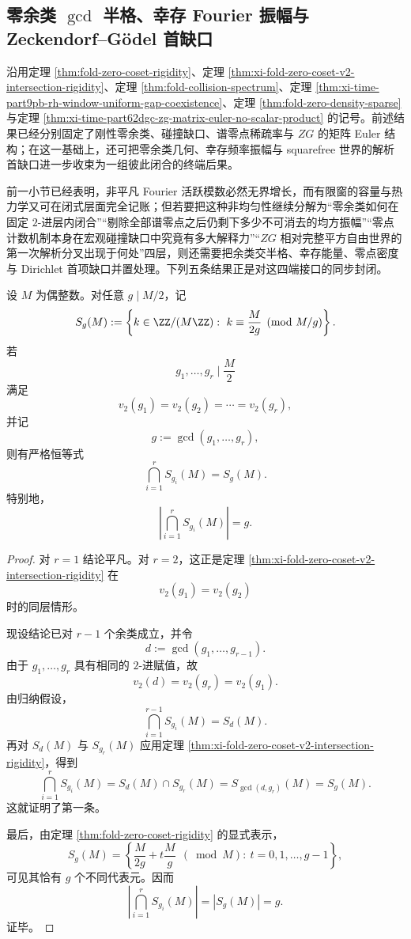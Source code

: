 \subsection{零余类 \texorpdfstring{$\gcd$}{gcd} 半格、幸存 Fourier 振幅与 Zeckendorf--Gödel 首缺口}\label{subsec:conclusion-zero-coset-surviving-amplitude-zg-gap}
沿用定理 \ref{thm:fold-zero-coset-rigidity}、定理 \ref{thm:xi-fold-zero-coset-v2-intersection-rigidity}、定理 \ref{thm:fold-collision-spectrum}、定理 \ref{thm:xi-time-part9pb-rh-window-uniform-gap-coexistence}、定理 \ref{thm:fold-zero-density-sparse} 与定理 \ref{thm:xi-time-part62dgc-zg-matrix-euler-no-scalar-product} 的记号。前述结果已经分别固定了刚性零余类、碰撞缺口、谱零点稀疏率与 \(ZG\) 的矩阵 Euler 结构；在这一基础上，还可把零余类几何、幸存频率振幅与 squarefree 世界的解析首缺口进一步收束为一组彼此闭合的终端后果。

\begin{remark}\label{rem:conclusion-zero-coset-surviving-amplitude-zg-gap-interface}
前一小节已经表明，非平凡 Fourier 活跃模数必然无界增长，而有限窗的容量与热力学又可在闭式层面完全记账；但若要把这种非均匀性继续分解为“零余类如何在固定 \(2\)-进层内闭合”“剔除全部谱零点之后仍剩下多少不可消去的均方振幅”“零点计数机制本身在宏观碰撞缺口中究竟有多大解释力”“\(ZG\) 相对完整平方自由世界的第一次解析分叉出现于何处”四层，则还需要把余类交半格、幸存能量、零点密度与 Dirichlet 首项缺口并置处理。下列五条结果正是对这四端接口的同步封闭。
\end{remark}

\begin{theorem}\label{thm:conclusion-zero-coset-fixed-v2-finite-intersection-gcd}
设 \(M\) 为偶整数。对任意 \(g\mid M/2\)，记
\[
S_g(M):=
\left\{
k\in \ZZ/(M\ZZ):\ k\equiv \frac{M}{2g}\pmod{M/g}
\right\}.
\]
若
\[
g_1,\dots,g_r\mid \frac{M}{2}
\]
满足
\[
v_2(g_1)=v_2(g_2)=\cdots=v_2(g_r),
\]
并记
\[
g:=\gcd(g_1,\dots,g_r),
\]
则有严格恒等式
\[
\boxed{\;
\bigcap_{i=1}^{r}S_{g_i}(M)=S_g(M).\;}
\]
特别地，
\[
\boxed{\;
\left|\bigcap_{i=1}^{r}S_{g_i}(M)\right|=g.\;}
\]
\end{theorem}
\begin{proof}
对 \(r=1\) 结论平凡。对 \(r=2\)，这正是定理 \ref{thm:xi-fold-zero-coset-v2-intersection-rigidity} 在
\[
v_2(g_1)=v_2(g_2)
\]
时的同层情形。

现设结论已对 \(r-1\) 个余类成立，并令
\[
d:=\gcd(g_1,\dots,g_{r-1}).
\]
由于 \(g_1,\dots,g_r\) 具有相同的 \(2\)-进赋值，故
\[
v_2(d)=v_2(g_r)=v_2(g_1).
\]
由归纳假设，
\[
\bigcap_{i=1}^{r-1}S_{g_i}(M)=S_d(M).
\]
再对 \(S_d(M)\) 与 \(S_{g_r}(M)\) 应用定理 \ref{thm:xi-fold-zero-coset-v2-intersection-rigidity}，得到
\[
\bigcap_{i=1}^{r}S_{g_i}(M)
=
S_d(M)\cap S_{g_r}(M)
=
S_{\gcd(d,g_r)}(M)
=
S_g(M).
\]
这就证明了第一条。

最后，由定理 \ref{thm:fold-zero-coset-rigidity} 的显式表示，
\[
S_g(M)=
\left\{
\frac{M}{2g}+t\frac{M}{g}\ \ (\bmod M):\ t=0,1,\dots,g-1
\right\},
\]
可见其恰有 \(g\) 个不同代表元。因而
\[
\left|\bigcap_{i=1}^{r}S_{g_i}(M)\right|
=
|S_g(M)|
=
g.
\]
证毕。
\end{proof}

